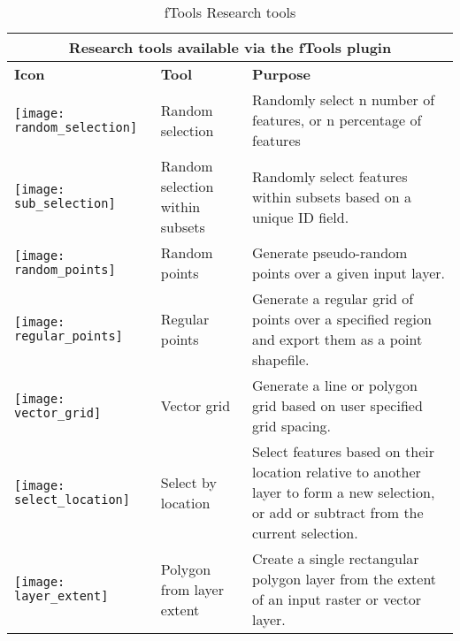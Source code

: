 \begin{table}[ht]
\centering
 \begin{tabular}{|m{1cm}|m{3cm}|m{9cm}|}
 \hline \multicolumn{3}{|c|}{\textbf{Research tools available via the fTools plugin}} \\
 \hline \textbf{Icon} & \textbf{Tool} & \textbf{Purpose} \\
 \hline \texttt{[image: random\_selection]} & Random selection & Randomly 
select n number of features, or n percentage of features \\
 \hline \texttt{[image: sub\_selection]} & Random selection within 
subsets & Randomly select features within subsets based on a unique ID field. \\
 \hline \texttt{[image: random\_points]} & Random points & Generate 
pseudo-random points over a given input layer. \\
 \hline \texttt{[image: regular\_points]} & Regular points & Generate 
a regular grid of points over a specified region and export them as a point shapefile. \\
 \hline \texttt{[image: vector\_grid]} & Vector grid & Generate a 
line or polygon grid based on user specified grid spacing. \\
 \hline \texttt{[image: select\_location]} & Select by location & 
Select features based on their location relative to another layer to form a 
new selection, or add or subtract from the current selection. \\
\hline \texttt{[image: layer\_extent]} & Polygon from layer extent & 
Create a single rectangular polygon layer from the extent of an input raster or vector layer. \\
 \hline
\end{tabular}
\caption{fTools Research tools}\label{tab:ftool_research}
\end{table}

